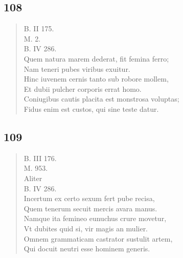 \documentclass[11pt, a4paper]{report}
\begin{document}
            \subsection*{108}
      \begin{verse}
      B. II 175. \\ M. 2. \\ B. IV 286. \\ Quem natura marem dederat, fit femina ferro; \\ Nam teneri pubes viribus exuitur. \\ Hinc iuvenem cernis tanto sub robore mollem, \\ Et dubii pulcher corporis errat homo. \\ Coniugibus cautis placita est monstrosa voluptas; \\ Fidus enim est custos, qui sine teste datur. \\ 
      \end{verse}
  
            \subsection*{109}
      \begin{verse}
      B. III 176. \\ M. 953. \\ Aliter \\ B. IV 286. \\ Incertum ex certo sexum fert pube recisa, \\ Quem tenerum secuit mercis avara manus. \\ Namque ita femineo eunuchus crure movetur, \\ Vt dubites quid si, vir  \lbrack magis \rbrack  an mulier. \\ Omnem grammaticam castrator sustulit artem, \\ Qui docuit neutri esse hominem generis. \\ 
      \end{verse}
  
\end{document}
